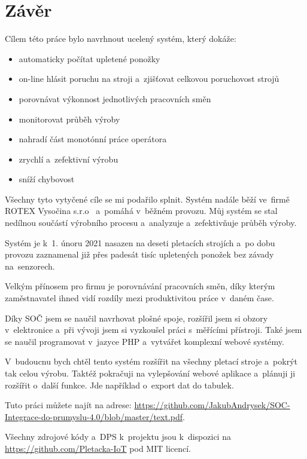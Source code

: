 \documentclass{template/socthesis}
\begin{document}
\section{Závěr}

Cílem této práce bylo navrhnout ucelený systém, který dokáže:

\begin{itemize}
    \item automaticky počítat upletené ponožky
    \item on-line hlásit poruchu na stroji a~zjišťovat celkovou poruchovost strojů
    \item porovnávat výkonnost jednotlivých pracovních směn
    \item monitorovat průběh výroby
    \item nahradí část monotónní práce operátora
    \item zrychlí a~zefektivní výrobu
    \item sníží chybovost
\end{itemize}

Všechny tyto vytyčené cíle se mi podařilo splnit. Systém nadále běží ve~firmě ROTEX Vysočina s.r.o~\cite{ROTEX} a~pomáhá v~běžném provozu.
Můj systém se stal nedílnou součástí výrobního procesu a analyzuje a~zefektivňuje průběh výroby.

Systém je k 1. únoru 2021 nasazen na deseti pletacích strojích a po dobu provozu zaznamenal již přes padesát tisíc upletených ponožek bez závady na~senzorech.

Velkým přínosem pro firmu je porovnávání pracovních směn, díky kterým zaměstnavatel ihned vidí rozdíly mezi produktivitou práce v~daném čase.

Díky SOČ jsem se naučil navrhovat plošné spoje, rozšířil jsem si obzory v~elektronice a~při vývoji jsem si vyzkoušel práci s~měřícími přístroji. 
Také jsem se naučil programovat v~jazyce PHP a~vytvářet komplexní webové systémy.

V~budoucnu bych chtěl tento systém rozšířit na všechny pletací stroje a~pokrýt tak celou výrobu.
Taktéž pokračuji na vylepšování webové aplikace a~plánuji ji rozšířit o~další funkce.
Jde například o~export dat do tabulek.

Tuto práci můžete najít na adrese: \url{https://github.com/JakubAndrysek/SOC-Integrace-do-prumyslu-4.0/blob/master/text.pdf}.

Všechny zdrojové kódy a~DPS k~projektu jsou k~dispozici na \url{https://github.com/Pletacka-IoT} pod MIT licencí.

\newpage


\printbibliography[title=Literatura]



\appendix
\end{document}
